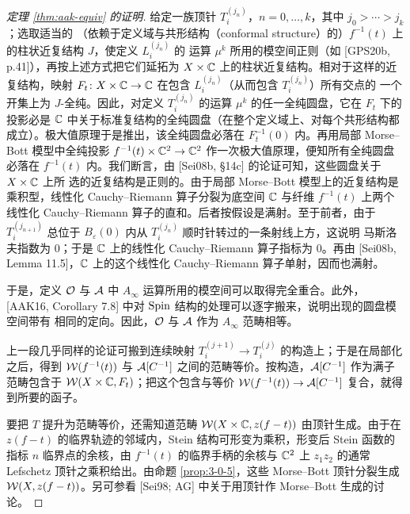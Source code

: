 \begin{proof}[定理 \ref{thm:aak-equiv} 的证明]
给定一族顶针 $T_i^{(j_n)}$，$n=0,\dots,k$，其中 $j_0>\cdots>j_k$；选取适当的
（依赖于定义域与共形结构（conformal structure）的）$f^{-1}(t)$ 上的柱状近复结构 $J$，使定义 $L_i^{(j_n)}$ 的
运算 $\mu^k$ 所用的模空间正则（如 [GPS20b, p.41]），再按上述方式把它们延拓为
$X\times\mathbb{C}$ 上的柱状近复结构。相对于这样的近复结构，映射
$F_t\colon X\times\mathbb{C}\to\mathbb{C}$ 在包含 $L_i^{(j_n)}$（从而包含 $T_i^{(j_n)}$）所有交点的
一个开集上为 $J$-全纯。因此，对定义 $T_i^{(j_n)}$ 的运算 $\mu^k$ 的任一全纯圆盘，它在
$F_t$ 下的投影必是 $\mathbb{C}$ 中关于标准复结构的全纯圆盘（在整个定义域上、对每个共形结构都
成立）。极大值原理于是推出，该全纯圆盘必落在 $F_t^{-1}(0)$ 内。再用局部 Morse--Bott
模型中全纯投影 $f^{-1}(t)\times\mathbb{C}^2\to\mathbb{C}^2$ 作一次极大值原理，便知所有全纯圆盘必落在
$f^{-1}(t)$ 内。我们断言，由 [Sei08b, §14c] 的论证可知，这些圆盘关于 $X\times\mathbb{C}$ 上所
选的近复结构是正则的。由于局部 Morse--Bott 模型上的近复结构是乘积型，线性化
Cauchy--Riemann 算子分裂为底空间 $\mathbb{C}$ 与纤维 $f^{-1}(t)$ 上两个线性化
Cauchy--Riemann 算子的直和。后者按假设是满射。至于前者，由于 $T_i^{(j_{n+1})}$ 总位于
$B_\varepsilon(0)$ 内从 $T_i^{(j_n)}$ 顺时针转过的一条射线上方，这说明 马斯洛夫指数为
$0$；于是 $\mathbb{C}$ 上的线性化 Cauchy--Riemann 算子指标为 $0$。再由
[Sei08b, Lemma 11.5]，$\mathbb{C}$ 上的这个线性化 Cauchy--Riemann 算子单射，因而也满射。


于是，定义 $\mathcal{O}$ 与 $\mathcal{A}$ 中 $A_\infty$ 运算所用的模空间可以取得完全重合。此外，
[AAK16, Corollary 7.8] 中对 $\mathrm{Spin}$ 结构的处理可以逐字搬来，说明出现的圆盘模空间带有
相同的定向。因此，$\mathcal{O}$ 与 $\mathcal{A}$ 作为 $A_\infty$ 范畴相等。

上一段几乎同样的论证可搬到连续映射 $T_i^{(j+1)}\to T_i^{(j)}$ 的构造上；于是在局部化
之后，得到 $\mathcal{W}(f^{-1}(t))$ 与 $\mathcal{A}[C^{-1}]$ 之间的范畴等价。按构造，$\mathcal{A}[C^{-1}]$
作为满子范畴包含于 $\mathcal{W}(X\times\mathbb{C},F_t)$；把这个包含与等价
$\mathcal{W}(f^{-1}(t))\to\mathcal{A}[C^{-1}]$ 复合，就得到所要的函子。


要把 $T$ 提升为范畴等价，还需知道范畴 $\mathcal{W}(X\times\mathbb{C},z(f-t))$ 由顶针生成。由于在
$z(f-t)$ 的临界轨迹的邻域内，Stein 结构可形变为乘积，形变后 Stein 函数的指标 $n$
临界点的余核，由 $f^{-1}(t)$ 的临界手柄的余核与 $\mathbb{C}^2$ 上 $z_1z_2$ 的通常 Lefschetz
顶针之乘积给出。由命题 \ref{prop:3-0-5}，这些 Morse--Bott 顶针分裂生成
$\mathcal{W}(X,z(f-t))$。另可参看 [Sei98; AG] 中关于用顶针作 Morse--Bott 生成的讨论。
\end{proof}

